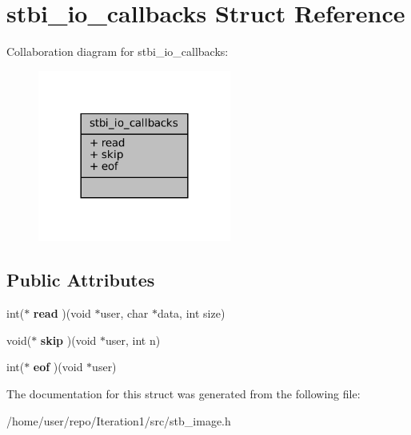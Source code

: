 \hypertarget{structstbi__io__callbacks}{}\section{stbi\+\_\+io\+\_\+callbacks Struct Reference}
\label{structstbi__io__callbacks}


Collaboration diagram for stbi\+\_\+io\+\_\+callbacks\+:\nopagebreak
\begin{figure}[H]
\begin{center}
\leavevmode
\includegraphics[width=180pt]{structstbi__io__callbacks__coll__graph}
\end{center}
\end{figure}
\subsection*{Public Attributes}
\begin{DoxyCompactItemize}
\item 
\mbox{\label{structstbi__io__callbacks_a623e46b3a2a019611601409926283a88}} 
int($\ast$ {\bfseries read} )(void $\ast$user, char $\ast$data, int size)
\item 
\mbox{\label{structstbi__io__callbacks_a257aac5480a90a6c4b8fbe86c1b01068}} 
void($\ast$ {\bfseries skip} )(void $\ast$user, int n)
\item 
\mbox{\label{structstbi__io__callbacks_a319639db2f76e715eed7a7a974136832}} 
int($\ast$ {\bfseries eof} )(void $\ast$user)
\end{DoxyCompactItemize}


The documentation for this struct was generated from the following file\+:\begin{DoxyCompactItemize}
\item 
/home/user/repo/\+Iteration1/src/stb\+\_\+image.\+h\end{DoxyCompactItemize}
